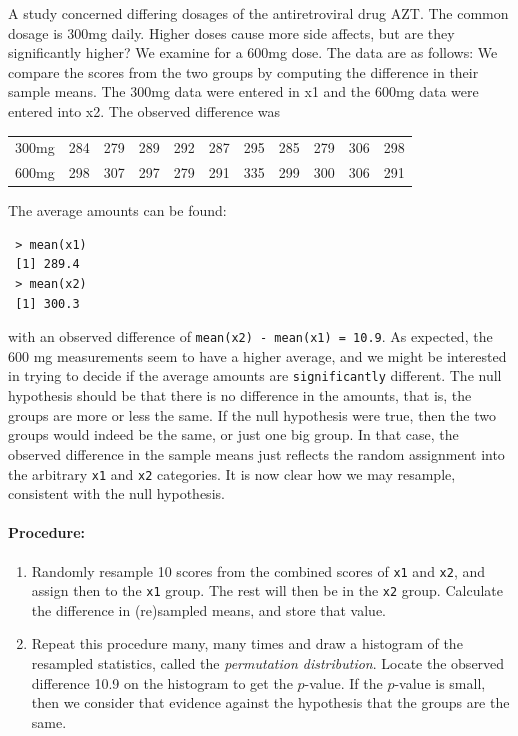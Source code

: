 \documentclass[captions=tableheading]{scrbook}
\begin{document}
\begin{example}
A study concerned differing dosages of the antiretroviral drug AZT. The common dosage is 300mg daily. Higher doses cause more side affects, but are they significantly higher? We examine for a 600mg dose. The data are as follows: We compare the scores from the two groups by computing the difference in their sample means. The 300mg data were entered in x1 and the 600mg data were entered into x2. The observed difference was


\begin{center}
\begin{tabular}{lrrrrrrrrrr}
 300mg  &  284  &  279  &  289  &  292  &  287  &  295  &  285  &  279  &  306  &  298  \\
 600mg  &  298  &  307  &  297  &  279  &  291  &  335  &  299  &  300  &  306  &  291  \\
\end{tabular}
\end{center}



The average amounts can be found:
\begin{verbatim}
 > mean(x1)
 [1] 289.4
 > mean(x2)
 [1] 300.3
\end{verbatim}

with an observed difference of \texttt{mean(x2) - mean(x1) = 10.9}. As expected, the 600 mg measurements seem to have a higher average, and we might be interested in trying to decide if the average amounts are \texttt{significantly} different. The null hypothesis should be that there is no difference in the amounts, that is, the groups are more or less the same. If the null hypothesis were true, then the two groups would indeed be the same, or just one big group. In that case, the observed difference in the sample means just reflects the random assignment into the arbitrary \texttt{x1} and \texttt{x2} categories. It is now clear how we may resample, consistent with the null hypothesis.

\paragraph*{Procedure:}

\begin{enumerate}
\item Randomly resample 10 scores from the combined scores of \texttt{x1} and \texttt{x2}, and assign then to the \texttt{x1} group. The rest will then be in the \texttt{x2} group. Calculate the difference in (re)sampled means, and store that value.
\item Repeat this procedure many, many times and draw a histogram of the resampled statistics, called the \emph{permutation distribution}. Locate the observed difference 10.9 on the histogram to get the \(p\)-value. If the \(p\)-value is small, then we consider that evidence against the hypothesis that the groups are the same.
\end{enumerate}


\end{example}
\end{document}
